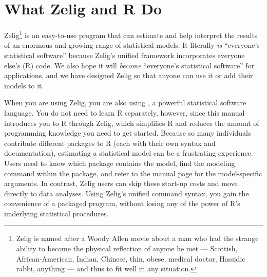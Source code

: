 \documentclass{article}
\begin{document}
\section{What Zelig and R Do}

Zelig\footnote{Zelig is named after a Woody Allen movie about a man
  who had the strange ability to become the physical reflection of
  anyone he met --- Scottish, African-American, Indian, Chinese, thin,
  obese, medical doctor, Hassidic rabbi, anything --- and thus to fit
  well in any situation.} is an easy-to-use program that can estimate
and help interpret the results of an enormous and growing range of
statistical models.  It literally \emph{is} ``everyone's statistical
software'' because Zelig's unified framework incorporates everyone
else's (R) code.  We also hope it will \emph{become} ``everyone's
statistical software'' for applications, and we have designed Zelig so
that anyone can use it or add their models to it.

When you are using Zelig, you are also using
, a powerful statistical software
language.  You do not need to learn R separately, however, since this
manual introduces you to R through Zelig, which simplifies
R and reduces the amount of programming knowledge you need to
get started.  Because so many individuals contribute different
packages to R (each with their own syntax and documentation),
estimating a statistical model can be a frustrating experience.  Users
need to know which package contains the model, find the modeling
command within the package, and refer to the manual page for the
model-specific arguments.  In contrast, Zelig users can skip these
start-up costs and move directly to data analyses.  Using Zelig's
unified command syntax, you gain the convenience of a packaged
program, without losing any of the power of R's underlying statistical
procedures.
\end{document}
